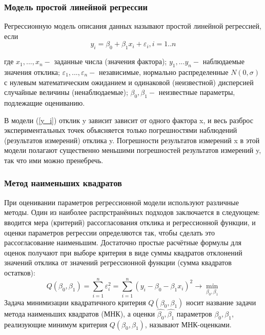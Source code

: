 \documentclass[a4paper]{article}
\begin{document}
	\subsubsection{Модель простой линейной регрессии}
	\noindent Регрессионную модель описания данных называют простой линейной регрессией, если
	\begin{equation}
	    y_{i} = \beta_{0} + \beta_{1}x_{i} + \varepsilon_{i},  i = 1..n
	    \label{y_i}
	\end{equation}

	\noindent где $x_1,...,x_n - $ заданные числа (значения фактора);
	$y_1,...y_n - $ наблюдаемые значения отклика;
	$\varepsilon_1,...,\varepsilon_n - $ независимые, нормально распределенные $N(0, \sigma)$ с нулевым математическим ожиданием и одинаковой (неизвестной) дисперсией случайные величины (ненаблюдаемые);
	$\beta_0, \beta_1 - $ неизвестные параметры, подлежащие оцениванию.
	
    \noindent В модели (\ref{y_i}) отклик y зависит зависит от одного фактора x, и весь разброс экспериментальных точек объясняется только погрешностями наблюдений (результатов измерений) отклика y. Погрешности результатов измерений x в этой модели полагают существенно меньшими погрешностей результатов измерений y, так что ими можно пренебречь.

	\subsubsection{Метод наименьших квадратов}
	\noindent При оценивании параметров регрессионной модели используют различные методы. Один из наиболее распрстранённых подходов заключается в следующем: вводится мера (критерий) рассогласования отклика и регрессионной функции, и оценки параметров регрессии определяются так, чтобы сделать это рассогласование наименьшим. Достаточно простые расчётные формулы для оценок получают при выборе критерия в виде суммы квадратов отклонений значений отклика от значений регрессионной функции (сумма квадратов остатков):
	$$
	    Q(\beta_{0}, \beta_{1}) = \sum_{i=1}^{n}{\varepsilon_{i}^{2}} = 
	    \sum_{i=1}^{n}{(y_{i} - \beta_{0} - \beta_{1}x_{i})^{2}}\rightarrow \min_{\beta_{0}, \beta_{1}}
	    \label{Q_beta}
	$$
	Задача минимизации квадратичного критерия $Q(\beta_0, \beta_1)$ носит название задачи метода наименьших квадратов (МНК), а оценки $\hat{\beta_0}, \hat{\beta_1}$ параметров $\beta_0, \beta_1$, реализующие минимум критерия $Q(\beta_0, \beta_1)$, называют МНК-оценками. 
\end{document}
